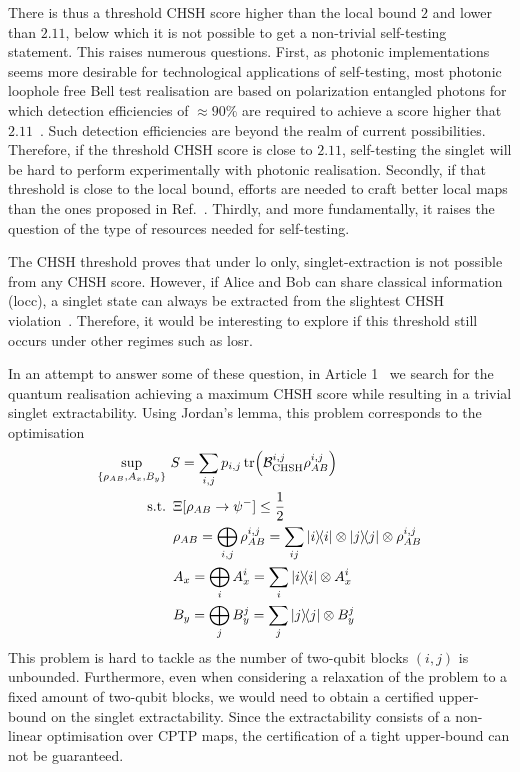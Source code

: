 \medbreak

There is thus a threshold CHSH score higher than the local bound $2$ and lower than $2.11$, below which it is not possible to get a non-trivial self-testing statement.
This raises numerous questions. 
First, as photonic implementations seems more desirable for technological applications of self-testing, most photonic loophole free Bell test realisation are based on polarization entangled photons for which detection efficiencies of $\approx 90\%$ are required to achieve a score higher that $2.11$~\cite{Vivoli2015b}. 
Such detection efficiencies are beyond the realm of current possibilities. 
Therefore, if the threshold CHSH score is close to $2.11$, self-testing the singlet will be hard to perform experimentally with photonic realisation.
Secondly, if that threshold is close to the local bound, efforts are needed to craft better local maps than the ones proposed in Ref.~\cite{Kaniewski2016}.
Thirdly, and more fundamentally, it raises the question of the type of resources needed for self-testing.

The CHSH threshold proves that under \acrfull{lo} only, singlet-extraction is not possible from any CHSH score.
However, if Alice and Bob can share classical information (\acrshort{locc}), a singlet state can always be extracted from the slightest CHSH violation~\cite{Bardyn2009}. 
Therefore, it would be interesting to explore if this threshold still occurs under other regimes such as \acrfull{losr}.

\medbreak

In an attempt to answer some of these question, in Article 1~\cite{Valcarce2020} we search for the quantum realisation achieving a maximum CHSH score while resulting in a trivial singlet extractability.
Using Jordan's lemma, this problem corresponds to the optimisation
\begin{equation}
	\begin{split}
		\sup_{\{\rho_{AB},A_x,B_y\}}\ &S=\sum_{i,j} p_{i,j} \tr (\mathcal{B}_\text{CHSH}^{i,j} \rho_{AB}^{i,j})\\
\textnormal{s.t.}\ &\,\Xi[\rho_{AB}\rightarrow \psi^-] \leq \frac{1}{2} \\
				   &\, \rho_{AB} = \bigoplus_{i,j} \rho_{AB}^{i,j} = \sum_{ij} \ketbra{i} \otimes \ketbra{j} \otimes \rho_{AB}^{i,j} \\
				   &\, A_x = \bigoplus_{i} A_x^i = \sum_{i} \ketbra{i} \otimes A_x^{i} \\
				   &\, B_y = \bigoplus_{j} B_y^j = \sum_{j} \ketbra{j} \otimes B_y^{j}
	\end{split}
	\label{eq:CHSH_threshold}
\end{equation}
This problem is hard to tackle as the number of two-qubit blocks $(i,j)$ is unbounded.
Furthermore, even when considering a relaxation of the problem to a fixed amount of two-qubit blocks, we would need to obtain a certified upper-bound on the singlet extractability.
Since the extractability consists of a non-linear optimisation over CPTP maps, the certification of a tight upper-bound can not be guaranteed.

